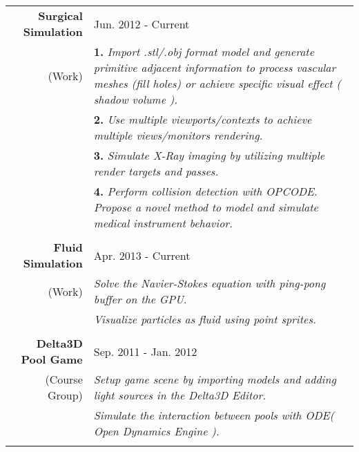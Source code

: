 \documentclass[a4paper,10pt]{article} %
\begin{document}
\begin{tabular}{r|p{12.0cm}}
\textbf{Surgical Simulation} &  Jun. 2012 - Current\\
\footnotesize{(Work)}& \footnotesize{\textbf{1.} \emph{Import .stl/.obj format model and generate primitive adjacent information to process vascular meshes (fill holes) or achieve specific visual effect ( shadow volume ).}} \\
& \footnotesize{\textbf{2.} \emph{Use multiple viewports/contexts to achieve multiple views/monitors rendering.}} \\
 & \footnotesize{\textbf{3.} \emph{Simulate X-Ray imaging by utilizing multiple render targets and passes. }}\\
 & \footnotesize{\textbf{4.} \emph{Perform collision detection with OPCODE. Propose a novel method to model and simulate medical instrument behavior.}}\\

\multicolumn{2}{c}{} \\


\textbf{Fluid Simulation} &  Apr. 2013 - Current \\
\footnotesize{(Work)}& \footnotesize{\emph{Solve the Navier-Stokes equation with ping-pong buffer on the GPU}}.\\
& \footnotesize{\emph{Visualize particles as fluid using point sprites.}}\\
\multicolumn{2}{c}{} \\


\textbf{Delta3D Pool Game} & Sep. 2011 - Jan. 2012 \\
\footnotesize{(Course Group)} & \footnotesize{\emph{Setup game scene by importing models and adding light sources in the Delta3D Editor.}}\\
& \footnotesize{\emph{ Simulate the interaction between pools with ODE( Open Dynamics Engine ).}}\\
\multicolumn{2}{c}{} \\




\end{tabular}
\end{document}
